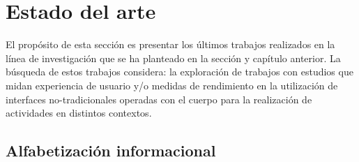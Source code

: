 \section{Estado del arte}
\label{sec:estado_arte}
El propósito de esta sección es presentar los últimos trabajos realizados en la línea de investigación que se ha planteado en la sección y capítulo anterior. La búsqueda de estos trabajos considera: la exploración de trabajos con estudios que midan experiencia de usuario y/o medidas de rendimiento en la utilización de interfaces no-tradicionales operadas con el cuerpo para la realización de actividades en distintos contextos.

\subsection{Alfabetización informacional}


